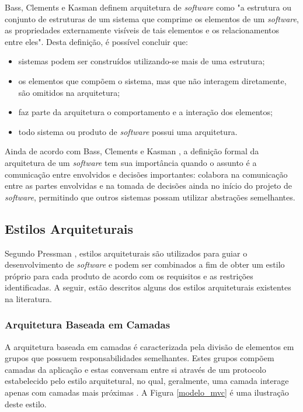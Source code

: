 Bass, Clements e Kasman \cite{bass_software_archi_practice_2003} definem arquitetura de \textit{software} como "a estrutura ou conjunto de estruturas de um sistema que comprime os elementos de um \textit{software}, as propriedades externamente visíveis de tais elementos e os relacionamentos entre eles". Desta definição, é possível concluir que:
\begin{itemize}
\item sistemas podem ser construídos utilizando-se mais de uma estrutura;
\item os elementos que compõem o sistema, mas que não interagem diretamente, são omitidos na arquitetura;
\item faz parte da arquitetura o comportamento e a interação dos elementos;
\item todo sistema ou produto de \textit{software} possui uma arquitetura.
\end{itemize}

Ainda de acordo com Bass, Clements e Kasman \cite{bass_software_archi_practice_2003}, a definição formal da arquitetura de um \textit{software} tem sua importância quando o assunto é a comunicação entre envolvidos e decisões importantes: colabora na comunicação entre as partes envolvidas e na tomada de decisões ainda no início do projeto de \textit{software}, permitindo que outros sistemas possam utilizar abstrações semelhantes.

\subsection{Estilos Arquiteturais}
Segundo Pressman \cite{pressman2006engenharia}, estilos arquiteturais são utilizados para guiar o desenvolvimento de \textit{software} e podem ser combinados a fim de obter um estilo próprio para cada produto de acordo com os requisitos e as restrições identificadas. A seguir, estão descritos alguns dos estilos arquiteturais existentes na literatura.

\subsubsection{Arquitetura Baseada em Camadas}
A arquitetura baseada em camadas é caracterizada pela divisão de elementos em grupos que possuem responsabilidades semelhantes. Estes grupos compõem camadas da aplicação e estas conversam entre si através de um protocolo estabelecido pelo estilo arquitetural, no qual, geralmente, uma camada interage apenas com camadas mais próximas \cite{pressman2006engenharia}. A Figura \ref{modelo_mvc} é uma ilustração deste estilo.

